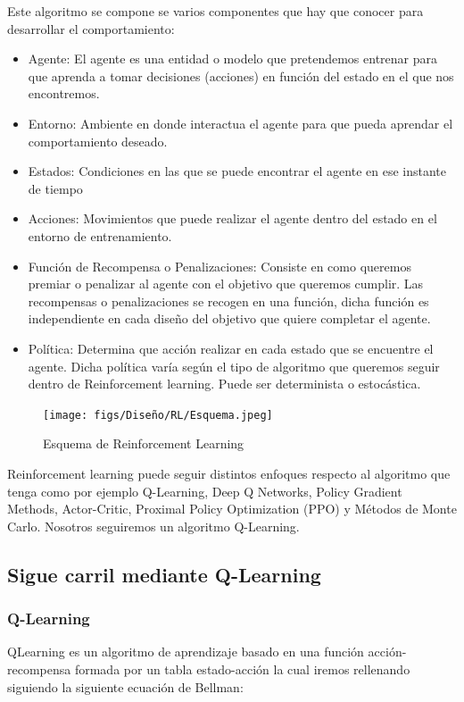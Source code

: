   Este algoritmo se compone se varios componentes que hay que conocer para desarrollar el comportamiento: 
  \begin{itemize} 
    \item Agente: El agente es una entidad o modelo que pretendemos entrenar para que aprenda a tomar decisiones (acciones) en función del estado en el que nos encontremos.
    \item Entorno: Ambiente en donde interactua el agente para que pueda aprendar el comportamiento deseado.
    \item Estados: Condiciones en las que se puede encontrar el agente en ese instante de tiempo
    \item Acciones: Movimientos que puede realizar el agente dentro del estado en el entorno de entrenamiento.
    \item Función de Recompensa o Penalizaciones: Consiste en como queremos premiar o penalizar al agente con el objetivo que queremos cumplir. Las recompensas o penalizaciones se recogen
    en una función, dicha función es independiente en cada diseño del objetivo que quiere completar el agente. 
    \item Política: Determina que acción realizar en cada estado que se encuentre el agente. Dicha política varía según el tipo de algoritmo que queremos seguir dentro de Reinforcement learning.
    Puede ser determinista o estocástica. 
  \end{itemize}

  \begin{figure} [H]
    \begin{center}
      \texttt{[image: figs/Diseño/RL/Esquema.jpeg]}
    \end{center}
    \caption{Esquema de Reinforcement Learning}
    \label{fig:esquemaRL}
  \end{figure}

  Reinforcement learning puede seguir distintos enfoques respecto al algoritmo que tenga como por ejemplo Q-Learning, Deep Q Networks, Policy Gradient Methods, Actor-Critic, 
  Proximal Policy Optimization (PPO) y Métodos de Monte Carlo. Nosotros seguiremos un algoritmo Q-Learning. 
  
  
  \subsection{Sigue carril mediante Q-Learning}
  \label{sec:QLearning}
  \subsubsection{Q-Learning}
  \label{sec:QLearning}
  QLearning es un algoritmo de aprendizaje basado en una función acción-recompensa formada por un tabla estado-acción la cual iremos rellenando siguiendo la siguiente ecuación 
  de Bellman: 

